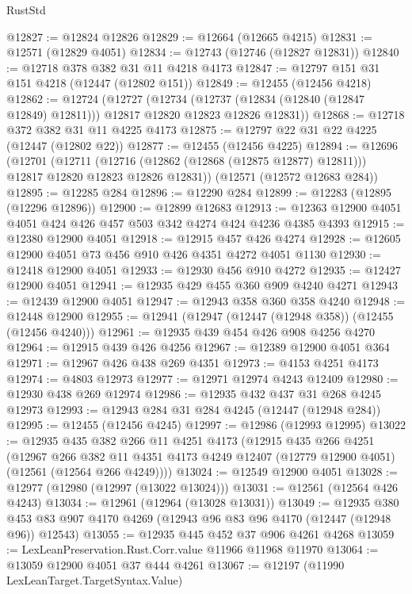 \begin{lexlean}{RustStd}
\begin{coremodule}
@12827 := @12824 @12826
@12829 := @12664 (@12665 @4215)
@12831 := @12571 (@12829 @4051)
@12834 := @12743 (@12746 (@12827 @12831))
@12840 := @12718 @378 @382 @31 @11 @4218 @4173
@12847 := @12797 @151 @31 @151 @4218 (@12447 (@12802 @151))
@12849 := @12455 (@12456 @4218)
@12862 := @12724
    (@12727
      (@12734 (@12737 (@12834 (@12840 (@12847 @12849) @12811))) @12817 @12820 @12823 @12826 @12831))
@12868 := @12718 @372 @382 @31 @11 @4225 @4173
@12875 := @12797 @22 @31 @22 @4225 (@12447 (@12802 @22))
@12877 := @12455 (@12456 @4225)
@12894 := @12696
    (@12701
      (@12711 (@12716 (@12862 (@12868 (@12875 @12877) @12811))) @12817 @12820 @12823 @12826 @12831))
    (@12571 (@12572 @12683 @284))
@12895 := @12285 @284
@12896 := @12290 @284
@12899 := @12283 (@12895 (@12296 @12896))
@12900 := @12899 @12683
@12913 := @12363 @12900 @4051 @4051 @424 @426 @457 @503 @342 @4274 @424 @4236 @4385 @4393
@12915 := @12380 @12900 @4051
@12918 := @12915 @457 @426 @4274
@12928 := @12605 @12900 @4051 @73 @456 @910 @426 @4351 @4272 @4051 @1130
@12930 := @12418 @12900 @4051
@12933 := @12930 @456 @910 @4272
@12935 := @12427 @12900 @4051
@12941 := @12935 @429 @455 @360 @909 @4240 @4271
@12943 := @12439 @12900 @4051
@12947 := @12943 @358 @360 @358 @4240
@12948 := @12448 @12900
@12955 := @12941 (@12947 (@12447 (@12948 @358)) (@12455 (@12456 @4240)))
@12961 := @12935 @439 @454 @426 @908 @4256 @4270
@12964 := @12915 @439 @426 @4256
@12967 := @12389 @12900 @4051 @364
@12971 := @12967 @426 @438 @269 @4351
@12973 := @4153 @4251 @4173
@12974 := @4803 @12973
@12977 := @12971 @12974 @4243 @12409
@12980 := @12930 @438 @269 @12974
@12986 := @12935 @432 @437 @31 @268 @4245 @12973
@12993 := @12943 @284 @31 @284 @4245 (@12447 (@12948 @284))
@12995 := @12455 (@12456 @4245)
@12997 := @12986 (@12993 @12995)
@13022 := @12935
    @435
    @382
    @266
    @11
    @4251
    @4173
    (@12915
      @435
      @266
      @4251
      (@12967
        @266
        @382
        @11
        @4351
        @4173
        @4249
        @12407
        (@12779 @12900 @4051)
        (@12561 (@12564 @266 @4249))))
@13024 := @12549 @12900 @4051
@13028 := @12977 (@12980 (@12997 (@13022 @13024)))
@13031 := @12561 (@12564 @426 @4243)
@13034 := @12961 (@12964 (@13028 @13031))
@13049 := @12935
    @380
    @453
    @83
    @907
    @4170
    @4269
    (@12943 @96 @83 @96 @4170 (@12447 (@12948 @96)) @12543)
@13055 := @12935 @445 @452 @37 @906 @4261 @4268
@13059 := LexLeanPreservation.Rust.Corr.value @11966 @11968 @11970
@13064 := @13059 @12900 @4051 @37 @444 @4261
@13067 := @12197 (@11990 LexLeanTarget.TargetSyntax.Value)

\end{coremodule}
\end{lexlean}
